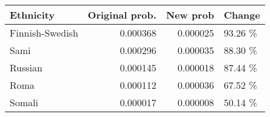 \begin{tabular}{lrrl}
\toprule
      Ethnicity &  Original prob. &  New prob &  Change \\
\midrule
Finnish-Swedish &        0.000368 &  0.000025 & 93.26 \% \\
           Sami &        0.000296 &  0.000035 & 88.30 \% \\
        Russian &        0.000145 &  0.000018 & 87.44 \% \\
           Roma &        0.000112 &  0.000036 & 67.52 \% \\
         Somali &        0.000017 &  0.000008 & 50.14 \% \\
\bottomrule
\end{tabular}
